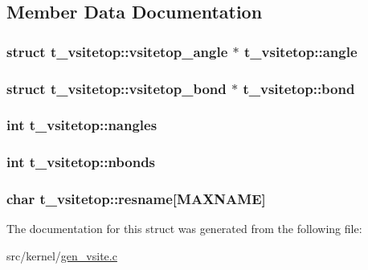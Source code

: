 \subsection{\-Member \-Data \-Documentation}
\hypertarget{structt__vsitetop_abdf4ff083d791dade7d1b837109c9742}{
\subsubsection[{angle}]{\setlength{\rightskip}{0pt plus 5cm}struct {\bf t\-\_\-vsitetop\-::vsitetop\-\_\-angle} $\ast$ {\bf t\-\_\-vsitetop\-::angle}}}\label{structt__vsitetop_abdf4ff083d791dade7d1b837109c9742}
\hypertarget{structt__vsitetop_a0f831e770c224eed94418543e5c4fe57}{
\subsubsection[{bond}]{\setlength{\rightskip}{0pt plus 5cm}struct {\bf t\-\_\-vsitetop\-::vsitetop\-\_\-bond} $\ast$ {\bf t\-\_\-vsitetop\-::bond}}}\label{structt__vsitetop_a0f831e770c224eed94418543e5c4fe57}
\hypertarget{structt__vsitetop_ab6bce5dfd773ee15a2021f715460a5e7}{
\subsubsection[{nangles}]{\setlength{\rightskip}{0pt plus 5cm}int {\bf t\-\_\-vsitetop\-::nangles}}}\label{structt__vsitetop_ab6bce5dfd773ee15a2021f715460a5e7}
\hypertarget{structt__vsitetop_a6905a08625396ff25c673b367694bff0}{
\subsubsection[{nbonds}]{\setlength{\rightskip}{0pt plus 5cm}int {\bf t\-\_\-vsitetop\-::nbonds}}}\label{structt__vsitetop_a6905a08625396ff25c673b367694bff0}
\hypertarget{structt__vsitetop_a0063673337d992b2aa4472dcf6dbe045}{
\subsubsection[{resname}]{\setlength{\rightskip}{0pt plus 5cm}char {\bf t\-\_\-vsitetop\-::resname}\mbox{[}{\bf \-M\-A\-X\-N\-A\-M\-E}\mbox{]}}}\label{structt__vsitetop_a0063673337d992b2aa4472dcf6dbe045}


\-The documentation for this struct was generated from the following file\-:\begin{DoxyCompactItemize}
\item 
src/kernel/\hyperlink{gen__vsite_8c}{gen\-\_\-vsite.\-c}\end{DoxyCompactItemize}
